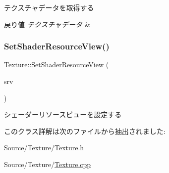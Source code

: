 テクスチャデータを取得する 
\begin{DoxyRetVals}{戻り値}
{\em テクスチャデータ} & \\
\hline
\end{DoxyRetVals}
\mbox{\label{class_texture_a280d4de4b1e45c3468a72df4fbd7f50d}} 
\subsubsection{\texorpdfstring{Set\+Shader\+Resource\+View()}{SetShaderResourceView()}}
{\footnotesize\ttfamily Texture\+::\+Set\+Shader\+Resource\+View (\begin{DoxyParamCaption}\item[{const D3\+D12\+\_\+\+S\+H\+A\+D\+E\+R\+\_\+\+R\+E\+S\+O\+U\+R\+C\+E\+\_\+\+V\+I\+E\+W\+\_\+\+D\+E\+SC \&}]{srv }\end{DoxyParamCaption})}

シェーダーリソースビューを設定する 

このクラス詳解は次のファイルから抽出されました\+:\begin{DoxyCompactItemize}
\item 
Source/\+Texture/\mbox{\hyperlink{_texture_8h}{Texture.\+h}}\item 
Source/\+Texture/\mbox{\hyperlink{_texture_8cpp}{Texture.\+cpp}}\end{DoxyCompactItemize}
